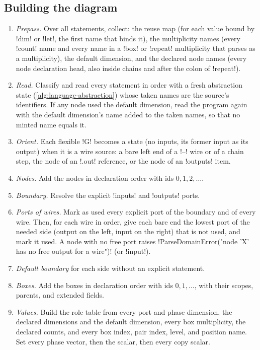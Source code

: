 \subsection{Building the diagram}

\begin{algorithm}\label{alg:language-dsl-build}
\leavevmode
\begin{enumerate}
\item \emph{Prepass.} Over all statements, collect: the reuse map (for each value bound by \code!dim! or \code!let!, the first name that binds it), the multiplicity names (every \code!count! name and every name in a \code!box! or \code!repeat! multiplicity that parses as a multiplicity), the default dimension, and the declared node names (every node declaration head, also inside chains and after the colon of \code!repeat!).
\item \emph{Read.} Classify and read every statement in order with a fresh abstraction state (\cref{alg:language-abstraction}) whose taken names are the source's identifiers. If any node used the default dimension, read the program again with the default dimension's name added to the taken names, so that no minted name equals it.
\item \emph{Orient.} Each flexible \code!G! becomes a state (no inputs, its former input as its output) when it is a wire source: a bare left end of a \code!--! wire or of a chain step, the node of an \code!.out! reference, or the node of an \code!outputs! item.
\item \emph{Nodes.} Add the nodes in declaration order with ids $0,1,2,\ldots$.
\item \emph{Boundary.} Resolve the explicit \code!inputs! and \code!outputs! ports.
\item \emph{Ports of wires.} Mark as used every explicit port of the boundary and of every wire. Then, for each wire in order, give each bare end the lowest port of the needed side (output on the left, input on the right) that is not used, and mark it used. A node with no free port raises \code!ParseDomainError("node 'X' has no free output for a wire")! (or \code!input!).
\item \emph{Default boundary} for each side without an explicit statement.
\item \emph{Boxes.} Add the boxes in declaration order with ids $0,1,\ldots$, with their scopes, parents, and extended fields.
\item \emph{Values.} Build the role table from every port and phase dimension, the declared dimensions and the default dimension, every box multiplicity, the declared counts, and every box index, pair index, level, and position name. Set every phase vector, then the scalar, then every copy scalar.

\end{enumerate}
\end{algorithm}
